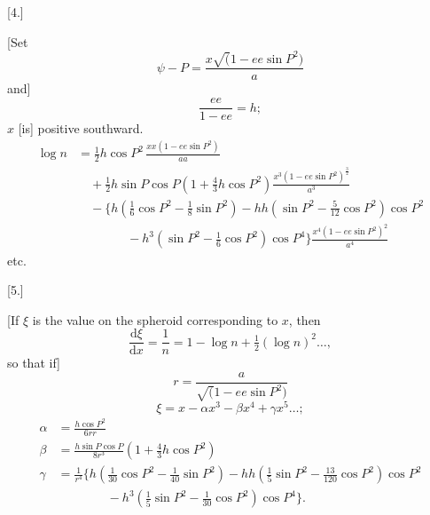 \par\clearpage
\noindent\makebox[12mm][l]{}\par\medskip

\begin{center}[4.]\end{center}
[Set
\[
\psi-P=\frac{x\surd(1-ee\sin P^2)}a
\]
\noindent and]
\[
\frac{ee}{1-ee}=h;
\]
\noindent \(x\) [is] positive southward.\quad [Then]
\[
\begin{aligned}
\log n&=\tfrac12h\cos P^2\,\frac{xx(1-ee\sin P^2)}{aa}\\
&\quad+\tfrac12h\sin P\cos P(1+\tfrac43h\cos P^2)
\frac{x^3(1-ee\sin P^2)^{\frac32}}{a^3}\\
&\quad-\{h(\tfrac16\cos P^2-\tfrac18\sin P^2)
-hh(\sin P^2-\tfrac5{12}\cos P^2)\cos P^2\\
&\qquad\qquad-h^3(\sin P^2-\tfrac16\cos P^2)\cos P^4\}
\frac{x^4(1-ee\sin P^2)^2}{a^4}
\end{aligned}
\]
\noindent\hfill etc.\hfill\null\par

\bigskip
\begin{center}[5.]\end{center}
[If \(\xi\) is the value on the spheroid corresponding to \(x\), then
\[
\frac{\mathrm d\xi}{\mathrm dx}=\frac1n=1-\log n+\tfrac12(\log n)^2\ldots,
\]
\noindent so that if]
\[
r=\frac a{\surd(1-ee\sin P^2)}
\]
\[
\xi=x-\alpha x^3-\beta x^4+\gamma x^5\ldots;
\]
\[
\begin{aligned}
\alpha&=\frac{h\cos P^2}{6rr}\\
\beta&=\frac{h\sin P\cos P}{8r^3}(1+\tfrac43h\cos P^2)\\
\gamma&=\frac1{r^4}\{h(\tfrac1{30}\cos P^2-\tfrac1{40}\sin P^2)
-hh(\tfrac15\sin P^2-\tfrac{13}{120}\cos P^2)\cos P^2\\
&\qquad\qquad-h^3(\tfrac15\sin P^2-\tfrac1{30}\cos P^2)\cos P^4\}.
\end{aligned}
\]
\par
\endgroup
